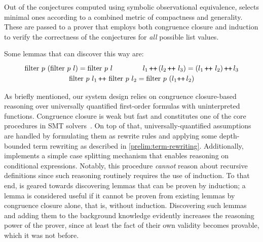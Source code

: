 Out of the conjectures computed using symbolic observational equivalence, \TheSy selects minimal ones according to a combined metric of compactness and generality.
These are passed to a prover that employs both congruence closure and induction to verify the correctness of the conjectures for \emph{all} possible list values.

Some lemmas that \TheSy can discover this way are:
\[
\renewcommand\arraystretch{1.2}
\begin{array}{c}
\tfilter~p~(\tfilter~p~l) = \tfilter~p~l
 \hspace{1.5cm}
l_1 \,{\concat}\, (l_2 \,{\concat}~ l_3) = (l_1 \,{\concat}~ l_2) \,{\concat}\, l_3 \\
\tfilter~p~l_1 \concat \,\tfilter~p~l_2 =
\tfilter~p~(l_1{\concat}\,l_2)
\end{array}
\]

As briefly mentioned, our system design relies on congruence closure-based reasoning over universally quantified first-order formulas with uninterpreted functions.
Congruence closure is weak but fast and constitutes one of the core procedures in SMT solvers~\cite{egraphsnelson1980fast,IC2007:Nieuwenhuis}.
On top of that, universally-quantified assumptions~\cite{TACAS2017:Barbosa} are handled by formulating them as rewrite rules and applying some depth-bounded term rewriting as described in \autoref{prelim:term-rewriting}.
Additionally, \TheSy implements a simple case splitting mechanism that enables reasoning on conditional expressions.
Notably, this procedure \emph{cannot} reason about recursive definitions since such reasoning routinely requires the use of induction.
To that end, \TheSy is geared towards discovering lemmas that can be proven by induction; a lemma is considered useful if it cannot be proven from existing lemmas by congruence closure alone, that is, without induction.
Discovering such lemmas and adding them to the background knowledge evidently increases the reasoning power of the prover, since at least the fact of their own validity becomes provable, which it was not before.
